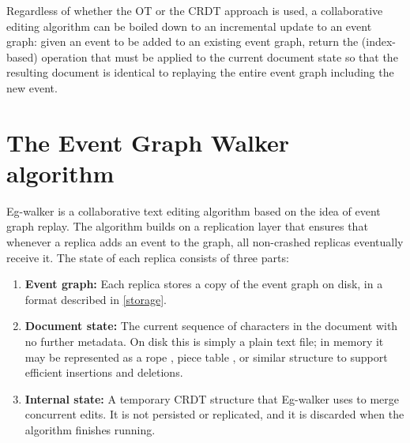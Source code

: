 \documentclass[sigplan,10pt]{acmart}
\newcommand{\algname}{Eg-walker\xspace}
\begin{document}


Regardless of whether the OT or the CRDT approach is used, a collaborative editing algorithm can be boiled down to an incremental update to an event graph: given an event to be added to an existing event graph, return the (index-based) operation that must be applied to the current document state so that the resulting document is identical to replaying the entire event graph including the new event.


\section{The Event Graph Walker algorithm}\label{algorithm}

\algname is a collaborative text editing algorithm based on the idea of event graph replay.
The algorithm builds on a replication layer that ensures that whenever a replica adds an event to the graph, all non-crashed replicas eventually receive it.
The state of each replica consists of three parts:

\begin{enumerate}
\item \textbf{Event graph:} Each replica stores a copy of the event graph on disk, in a format described in \autoref{storage}.
\item \textbf{Document state:} The current sequence of characters in the document with no further metadata. On disk this is simply a plain text file; in memory it may be represented as a rope \cite{Boehm1995}, piece table \cite{vscode-buffer}, or similar structure to support efficient insertions and deletions.
\item \textbf{Internal state:} A temporary CRDT structure that \algname uses to merge concurrent edits. It is not persisted or replicated, and it is discarded when the algorithm finishes running.
\end{enumerate}
\end{document}
